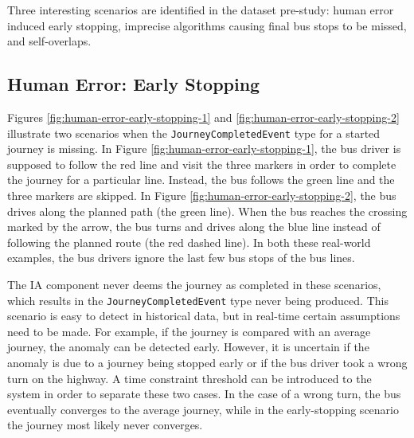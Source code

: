Three interesting scenarios are identified in the dataset pre-study: human error induced early stopping, imprecise algorithms causing final bus stops to be missed, and self-overlaps.

\subsection{Human Error: Early Stopping}
Figures \ref{fig:human-error-early-stopping-1} and \ref{fig:human-error-early-stopping-2} illustrate two scenarios when the \texttt{JourneyCompletedEvent} type for a started journey is missing.
In Figure \ref{fig:human-error-early-stopping-1}, the bus driver is supposed to follow the red line and visit the three markers in order to complete the journey for a particular line.
Instead, the bus follows the green line and the three markers are skipped.
In Figure \ref{fig:human-error-early-stopping-2}, the bus drives along the planned path (the green line).
When the bus reaches the crossing marked by the arrow, the bus turns and drives along the blue line instead of following the planned route (the red dashed line).
In both these real-world examples, the bus drivers ignore the last few bus stops of the bus lines.

The IA component never deems the journey as completed in these scenarios, which results in the \texttt{JourneyCompletedEvent} type never being produced.
This scenario is easy to detect in historical data, but in real-time certain assumptions need to be made.
For example, if the journey is compared with an average journey, the anomaly can be detected early.
However, it is uncertain if the anomaly is due to a journey being stopped early or if the bus driver took a wrong turn on the highway.
A time constraint threshold can be introduced to the system in order to separate these two cases.
In the case of a wrong turn, the bus eventually converges to the average journey, while in the early-stopping scenario the journey most likely never converges.


